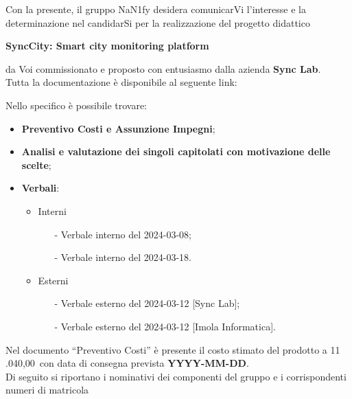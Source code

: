 Con la presente, il gruppo NaN1fy desidera comunicarVi l'interesse e la determinazione nel candidarSi per la realizzazione del progetto didattico \\
\begin{center}
	\textbf{SyncCity: Smart city monitoring platform}
\end{center}
da Voi commissionato e proposto con entusiasmo dalla azienda \textbf{Sync Lab}.
\vspace{1em}
\\Tutta la documentazione è disponibile al seguente link: 
\begin{center}
	\textbf{\href{https://github.com/NaN1fy/docs/tree/main/documents/candidatura}{\color{myblue}{https://github.com/NaN1fy/docs/tree/main/documents/candidatura}}}
\end{center}
Nello specifico è possibile trovare:
\begin{itemize}
	\item \textbf{Preventivo Costi e Assunzione Impegni};
	\item \textbf{Analisi e valutazione dei singoli capitolati con motivazione delle scelte};
	\item \textbf{Verbali}: 
		\begin{itemize}
			\item Interni 
				\begin{itemize}
					\item[-] Verbale interno del 2024-03-08;
					\item[-] Verbale interno del 2024-03-18.
				\end{itemize}
			\item Esterni
				\begin{itemize}
					\item[-] Verbale esterno del 2024-03-12 [Sync Lab];
					\item[-] Verbale esterno del 2024-03-12 [Imola Informatica].
				\end{itemize}
		\end{itemize}
\end{itemize}
\vspace{1em}
Nel documento “Preventivo Costi” è presente il costo stimato del prodotto a 11 .040,00\;\texteuro\ con data di consegna prevista \textbf{YYYY-MM-DD}.\\
\vspace{1em}
Di seguito si riportano i nominativi dei componenti del gruppo e i corrispondenti numeri di matricola\\
